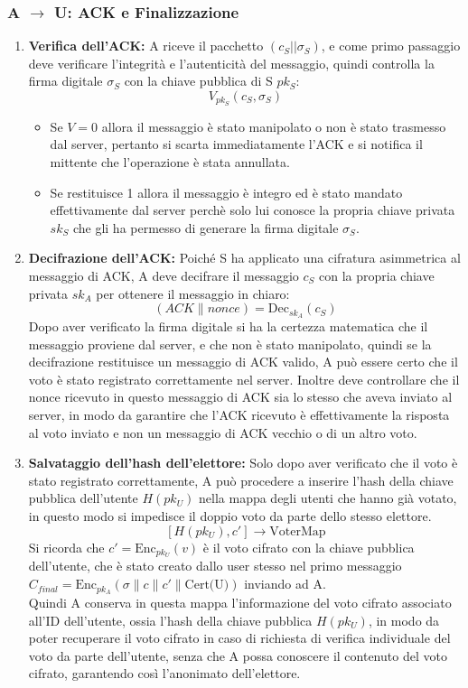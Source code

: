 	\subsubsection{A $\to$ U: ACK e Finalizzazione}
		\begin{enumerate}
			\item \textbf{Verifica dell'ACK:} A riceve il pacchetto $(c_S||\sigma_S)$, e come primo passaggio deve verificare l'integrità e l'autenticità del messaggio, quindi controlla la firma digitale $\sigma_S$ con la chiave pubblica di S $pk_S$:
			$$ V_{pk_S}(c_S, \sigma_S) $$
			\begin{itemize}
				\item Se $V=0$ allora il messaggio è stato manipolato o non è stato trasmesso dal server, pertanto si scarta immediatamente l'ACK e si notifica il mittente che l'operazione è stata annullata.
				
				\item Se restituisce 1 allora il messaggio è integro ed è stato mandato effettivamente dal server perchè solo lui conosce la propria chiave privata $sk_S$ che gli ha permesso di generare la firma digitale $\sigma_S$.
			\end{itemize}
			
			\item \textbf{Decifrazione dell'ACK:} Poiché S ha applicato una cifratura asimmetrica al messaggio di ACK, A deve decifrare il messaggio $c_S$ con la propria chiave privata $sk_A$ per ottenere il messaggio in chiaro:
			$$ (ACK\|nonce) = \text{Dec}_{sk_A}(c_S) $$
			Dopo aver verificato la firma digitale si ha la certezza matematica che il messaggio proviene dal server, e che non è stato manipolato, quindi se la decifrazione restituisce un messaggio di ACK valido, A può essere certo che il voto è stato registrato correttamente nel server. Inoltre deve controllare che il nonce ricevuto in questo messaggio di ACK sia lo stesso che aveva inviato al server, in modo da garantire che l'ACK ricevuto è effettivamente la risposta al voto inviato e non un messaggio di ACK vecchio o di un altro voto.

			\item \textbf{Salvataggio dell'hash dell'elettore:} Solo dopo aver verificato che il voto è stato registrato correttamente, A può procedere a inserire l'hash della chiave pubblica dell'utente $H(pk_U)$ nella mappa degli utenti che hanno già votato, in questo modo si impedisce il doppio voto da parte dello stesso elettore.
			$$ [H(pk_U),c'] \to \text{VoterMap} $$
			Si ricorda che $c'=\text{Enc}_{pk_U}(v)$ è il voto cifrato con la chiave pubblica dell'utente, che è stato creato dallo user stesso nel primo messaggio $C_{final}=\text{Enc}_{pk_A}(\sigma \| c\| c'\| \text{Cert(U)})$ inviando ad A.\\
			Quindi A conserva in questa mappa l'informazione del voto cifrato associato all'ID dell'utente, ossia l'hash della chiave pubblica $H(pk_U)$, in modo da poter recuperare il voto cifrato in caso di richiesta di verifica individuale del voto da parte dell'utente, senza che A possa conoscere il contenuto del voto cifrato, garantendo così l'anonimato dell'elettore.


\end{enumerate}
